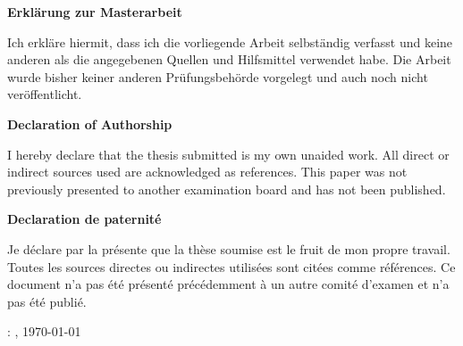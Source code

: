 \thispagestyle{empty}

\hfill
\vfill 


\begin{center}
\textbf{Erklärung zur Masterarbeit}

Ich erkläre hiermit, dass ich die vorliegende Arbeit selbständig verfasst und keine
anderen als die angegebenen Quellen und Hilfsmittel verwendet habe. Die Arbeit wurde
bisher keiner anderen Prüfungsbehörde vorgelegt und auch noch nicht veröffentlicht. 

\vspace{1cm}
\textbf{Declaration of Authorship}

I hereby declare that the thesis submitted is my own unaided work. All direct or indirect
sources used are acknowledged as references. This paper was not previously presented to
another examination board and has not been published.

\vspace{1cm}
\textbf{Declaration de paternité}

Je déclare par la présente que la thèse soumise est le fruit de mon propre travail. Toutes les sources directes ou indirectes utilisées sont citées comme références. Ce document n'a pas été présenté précédemment à un autre comité d'examen et n'a pas été publié.
\vspace{1cm}
\end{center}

\vfill

\noindent\myName: \textit{\myTitle}, \today \textcopyright\

%
%
%
%
%
